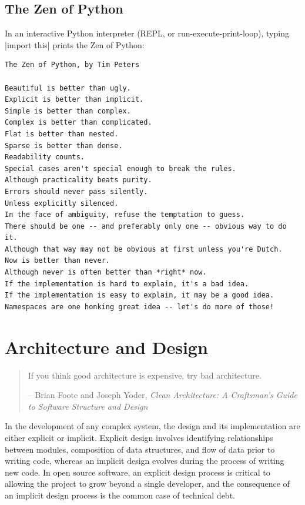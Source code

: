 \documentclass[]{nrel}
\begin{document}
\subsection{The Zen of Python}
\label{sec:zen}

In an interactive Python interpreter (REPL, or run-execute-print-loop), typing |import this| prints the Zen of Python:

\begin{lstlisting}
The Zen of Python, by Tim Peters

Beautiful is better than ugly.
Explicit is better than implicit.
Simple is better than complex.
Complex is better than complicated.
Flat is better than nested.
Sparse is better than dense.
Readability counts.
Special cases aren't special enough to break the rules.
Although practicality beats purity.
Errors should never pass silently.
Unless explicitly silenced.
In the face of ambiguity, refuse the temptation to guess.
There should be one -- and preferably only one -- obvious way to do it.
Although that way may not be obvious at first unless you're Dutch.
Now is better than never.
Although never is often better than *right* now.
If the implementation is hard to explain, it's a bad idea.
If the implementation is easy to explain, it may be a good idea.
Namespaces are one honking great idea -- let's do more of those!
\end{lstlisting}

\section{Architecture and Design}

\begin{quote}
    If you think good architecture is expensive, try bad architecture.

    -- Brian Foote and Joseph Yoder, \textit{Clean Architecture: A Craftsman's Guide to Software Structure and Design}
\end{quote}

In the development of any complex system, the design and its implementation are either
explicit or implicit.
Explicit design involves identifying relationships between modules, composition of data
structures, and flow of data prior to writing code, whereas an implicit design evolves during the
process of writing new code.
In open source software, an explicit design process is critical to allowing the project
to grow beyond a single developer, and the consequence of an implicit design process
is the common case of technical debt.
\end{document}
